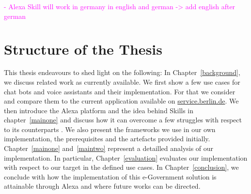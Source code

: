 \textcolor{magenta}{
	- Alexa Skill will work in germany in english and german -> add english after german
}




\section{Structure of the Thesis}
%

This thesis endeavours to shed light on the following: In Chapter~\ref{background}, we discuss related work as currently available. We first show a few use cases for chat bots and voice assistants and their implementation. For that we consider  and compare them to the current application available on \href{https://service.berlin.de/virtueller-assistent/virtueller-assistent-606279.php}{service.berlin.de}.
We then introduce the Alexa platform and the idea behind Skills in chapter~\ref{mainone} and discuss how it can overcome a few struggles with respect to its counterparts . We also present the frameworks we use in our own implementation, the prerequisites and the artefacts provided initially.
Chapter~\ref{mainone} and~\ref{maintwo} represent a detailled analysis of our implementation. In particular, 
Chapter~\ref{evaluation} evaluates our implementation with respect to our target in the defined  use cases. 
In Chapter~\ref{conclusion}, we conclude with how the implementation of this e-Government solution is attainable through Alexa and where future works can be directed. 
